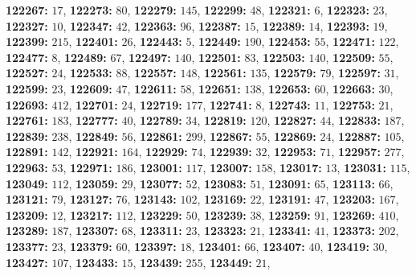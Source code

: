 \textsf{\bfseries 122267:} $17$, \textsf{\bfseries 122273:} $80$, \textsf{\bfseries 122279:} $145$, \textsf{\bfseries 122299:} $48$, \textsf{\bfseries 122321:} $6$, \textsf{\bfseries 122323:} $23$, \textsf{\bfseries 122327:} $10$, \textsf{\bfseries 122347:} $42$, \textsf{\bfseries 122363:} $96$, \textsf{\bfseries 122387:} $15$, \textsf{\bfseries 122389:} $14$, \textsf{\bfseries 122393:} $19$, \textsf{\bfseries 122399:} $215$, \textsf{\bfseries 122401:} $26$, \textsf{\bfseries 122443:} $5$, \textsf{\bfseries 122449:} $190$, \textsf{\bfseries 122453:} $55$, \textsf{\bfseries 122471:} $122$, \textsf{\bfseries 122477:} $8$, \textsf{\bfseries 122489:} $67$, \textsf{\bfseries 122497:} $140$, \textsf{\bfseries 122501:} $83$, \textsf{\bfseries 122503:} $140$, \textsf{\bfseries 122509:} $55$, \textsf{\bfseries 122527:} $24$, \textsf{\bfseries 122533:} $88$, \textsf{\bfseries 122557:} $148$, \textsf{\bfseries 122561:} $135$, \textsf{\bfseries 122579:} $79$, \textsf{\bfseries 122597:} $31$, \textsf{\bfseries 122599:} $23$, \textsf{\bfseries 122609:} $47$, \textsf{\bfseries 122611:} $58$, \textsf{\bfseries 122651:} $138$, \textsf{\bfseries 122653:} $60$, \textsf{\bfseries 122663:} $30$, \textsf{\bfseries 122693:} $412$, \textsf{\bfseries 122701:} $24$, \textsf{\bfseries 122719:} $177$, \textsf{\bfseries 122741:} $8$, \textsf{\bfseries 122743:} $11$, \textsf{\bfseries 122753:} $21$, \textsf{\bfseries 122761:} $183$, \textsf{\bfseries 122777:} $40$, \textsf{\bfseries 122789:} $34$, \textsf{\bfseries 122819:} $120$, \textsf{\bfseries 122827:} $44$, \textsf{\bfseries 122833:} $187$, \textsf{\bfseries 122839:} $238$, \textsf{\bfseries 122849:} $56$, \textsf{\bfseries 122861:} $299$, \textsf{\bfseries 122867:} $55$, \textsf{\bfseries 122869:} $24$, \textsf{\bfseries 122887:} $105$, \textsf{\bfseries 122891:} $142$, \textsf{\bfseries 122921:} $164$, \textsf{\bfseries 122929:} $74$, \textsf{\bfseries 122939:} $32$, \textsf{\bfseries 122953:} $71$, \textsf{\bfseries 122957:} $277$, \textsf{\bfseries 122963:} $53$, \textsf{\bfseries 122971:} $186$, \textsf{\bfseries 123001:} $117$, \textsf{\bfseries 123007:} $158$, \textsf{\bfseries 123017:} $13$, \textsf{\bfseries 123031:} $115$, \textsf{\bfseries 123049:} $112$, \textsf{\bfseries 123059:} $29$, \textsf{\bfseries 123077:} $52$, \textsf{\bfseries 123083:} $51$, \textsf{\bfseries 123091:} $65$, \textsf{\bfseries 123113:} $66$, \textsf{\bfseries 123121:} $79$, \textsf{\bfseries 123127:} $76$, \textsf{\bfseries 123143:} $102$, \textsf{\bfseries 123169:} $22$, \textsf{\bfseries 123191:} $47$, \textsf{\bfseries 123203:} $167$, \textsf{\bfseries 123209:} $12$, \textsf{\bfseries 123217:} $112$, \textsf{\bfseries 123229:} $50$, \textsf{\bfseries 123239:} $38$, \textsf{\bfseries 123259:} $91$, \textsf{\bfseries 123269:} $410$, \textsf{\bfseries 123289:} $187$, \textsf{\bfseries 123307:} $68$, \textsf{\bfseries 123311:} $23$, \textsf{\bfseries 123323:} $21$, \textsf{\bfseries 123341:} $41$, \textsf{\bfseries 123373:} $202$, \textsf{\bfseries 123377:} $23$, \textsf{\bfseries 123379:} $60$, \textsf{\bfseries 123397:} $18$, \textsf{\bfseries 123401:} $66$, \textsf{\bfseries 123407:} $40$, \textsf{\bfseries 123419:} $30$, \textsf{\bfseries 123427:} $107$, \textsf{\bfseries 123433:} $15$, \textsf{\bfseries 123439:} $255$, \textsf{\bfseries 123449:} $21$, 
